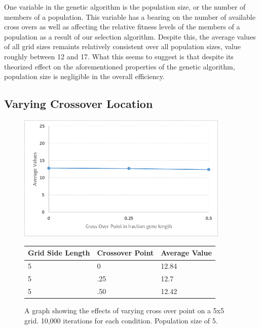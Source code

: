 \documentclass[12pt]{article}
\begin{document}
One variable in the genetic algorithm is the population size, or the number of members of a population. This variable has a bearing on the number of available cross overs as well as affecting the relative fitness levels of the members of a population as a result of our selection algorithm. Despite this, the average values of all grid sizes remaints relatively consistent over all population sizes, value roughly between 12 and 17. What this seems to suggest is that despite its theorized effect on the aforementioned properties of the genetic algorithm, population size is negligible in the overall efficiency. 

\subsection*{Varying Crossover Location}

\begin{figure}[H]
    \centering
    \includegraphics[width=0.9\textwidth]{5x5_GA_Cross}
\begin{tabular}{ |p{4cm}||p{4cm}|p{4cm}|  }
 \hline
Grid Side Length&Crossover Point&Average Value\\
 \hline
5&0&12.84\\
5&.25&12.7\\
5&.50&12.42\\
 \hline
\end{tabular}
    \caption{A graph showing the effects of varying cross over point on a 5x5 grid. 10,000 iterations for each condition. Population size of 5.}
    \label{fig:GAcross5x5}
\end{figure}
\end{document}
